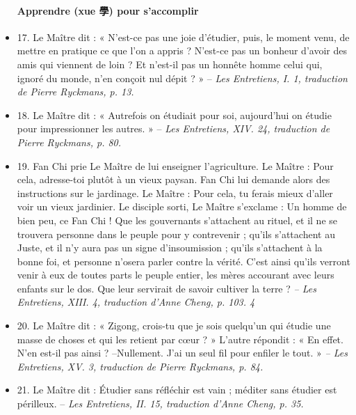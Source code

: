\begin{itemize}
\paragraph{Apprendre (xue 學) pour s’accomplir   }
\item 17. \newline Le Maître dit : « N’est-ce pas une joie d’étudier, puis, le moment venu, de mettre en pratique ce que l’on a appris ? N’est-ce pas un bonheur d’avoir des amis qui viennent de loin ? Et n’est-il pas un honnête homme celui qui, ignoré du monde, n’en conçoit nul dépit ? » -- \textit{\small Les Entretiens, I. 1, traduction de Pierre Ryckmans, p. 13.  }
\item 18. \newline Le Maître dit : « Autrefois on étudiait pour soi, aujourd’hui on étudie pour impressionner les autres. » -- \textit{\small Les Entretiens, XIV. 24, traduction de Pierre Ryckmans, p. 80.  }
\item 19. Fan Chi prie \newline Le Maître de lui enseigner l’agriculture. \newline Le Maître : Pour cela, adresse-toi plutôt à un vieux paysan. Fan Chi lui demande alors des instructions sur le jardinage. \newline Le Maître : Pour cela, tu ferais mieux d’aller voir un vieux jardinier.    \newline     Le disciple sorti, \newline Le Maître s’exclame : Un homme de bien peu, ce Fan Chi ! Que les gouvernants s’attachent au rituel, et il ne se trouvera personne dans le peuple pour y contrevenir ; qu’ils s’attachent au Juste, et il n’y aura pas un signe d’insoumission ; qu’ils s’attachent à la bonne foi, et personne n’osera parler contre la vérité. C’est ainsi qu’ils verront venir à eux de toutes parts le peuple entier, les mères accourant avec leurs enfants sur le dos. Que leur servirait de savoir cultiver la terre ? \textit{\small -- Les Entretiens, XIII. 4, traduction d’Anne Cheng, p. 103.    4 }

\item 20. \newline Le Maître dit : « Zigong, crois-tu que je sois quelqu’un qui étudie une masse de choses et qui les retient par cœur ? » \newline L’autre répondit : « En effet. N’en est-il pas ainsi ? \newline –Nullement. J’ai un seul fil pour enfiler le tout. » \textit{\small -- Les Entretiens, XV. 3, traduction de Pierre Ryckmans, p. 84.  }
\item 21. \newline Le Maître dit : Étudier sans réfléchir est vain ; méditer sans étudier est périlleux. -- \textit{\small Les Entretiens, II. 15, traduction d’Anne Cheng, p. 35.   }

\end{itemize}
